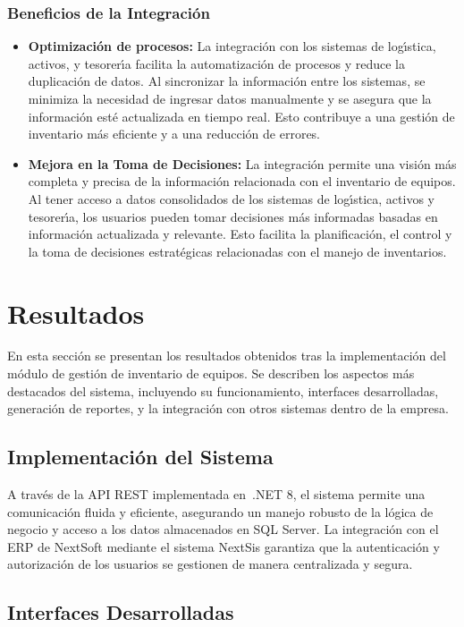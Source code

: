 \documentclass[stu, 12pt, letterpaper, donotrepeattitle, floatsintext, natbib]{apa7}
\begin{document}
\subsubsection{Beneficios de la Integraci\'on}
\begin{itemize}
    \item\textbf{Optimizaci\'on de procesos: }La integraci\'on con los sistemas de log\'{\i}stica, activos, y tesorer\'{\i}a facilita la automatizaci\'on de procesos y reduce la duplicaci\'on de datos. Al sincronizar la informaci\'on entre los sistemas, se minimiza la necesidad de ingresar datos manualmente y se asegura que la informaci\'on est\'e actualizada en tiempo real. Esto contribuye a una gesti\'on de inventario m\'as eficiente y a una reducci\'on de errores.
    \item\textbf{Mejora en la Toma de Decisiones: }La integraci\'on permite una visi\'on m\'as completa y precisa de la informaci\'on relacionada con el inventario de equipos. Al tener acceso a datos consolidados de los sistemas de log\'{\i}stica, activos y tesorer\'{\i}a, los usuarios pueden tomar decisiones m\'as informadas basadas en informaci\'on actualizada y relevante. Esto facilita la planificaci\'on, el control y la toma de decisiones estrat\'egicas relacionadas con el manejo de inventarios.
\end{itemize}
\newpage
\section{Resultados}
En esta secci\'on se presentan los resultados obtenidos tras la implementaci\'on del m\'odulo de gesti\'on de inventario de equipos. Se describen los aspectos m\'as destacados del sistema, incluyendo su funcionamiento, interfaces desarrolladas, generaci\'on de reportes, y la integraci\'on con otros sistemas dentro de la empresa.
\subsection{Implementaci\'on del Sistema}
A trav\'es de la API REST implementada en~.NET 8, el sistema permite una comunicaci\'on fluida y eficiente, asegurando un manejo robusto de la l\'ogica de negocio y acceso a los datos almacenados en SQL Server. La integraci\'on con el ERP de NextSoft mediante el sistema NextSis garantiza que la autenticaci\'on y autorizaci\'on de los usuarios se gestionen de manera centralizada y segura.
\subsection{Interfaces Desarrolladas}
\end{document}
